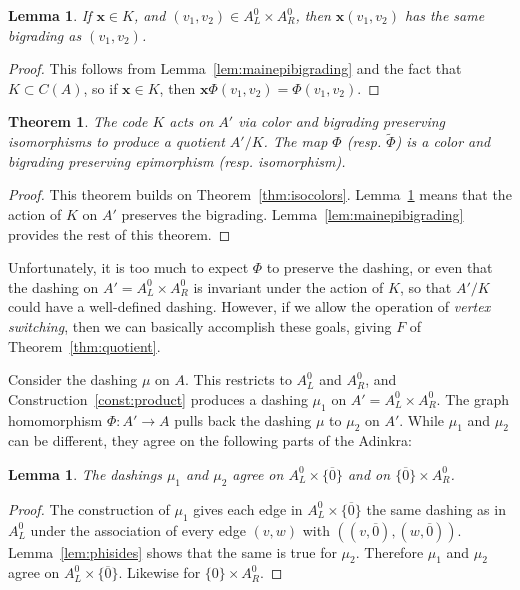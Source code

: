 \documentclass[12pt,twoside,singlespace]{article}
\numberwithin{equation}{section}
\newtheorem{thm}[equation]{Theorem}
\newtheorem{lem}[equation]{Lemma}
\theoremstyle{definition}
\renewcommand{\vec}[1]{\mathbf{#1}}
\begin{document}
\begin{lem}
\label{lem:kgrading}
If $\vec{x}\in K$, and $(v_1,v_2)\in A_L^0\times A_R^0$, then $\vec{x}(v_1,v_2)$ has the same bigrading as $(v_1,v_2)$.
\end{lem}
\begin{proof}
This follows from Lemma~\ref{lem:mainepibigrading} and the fact that $K\subset C(A)$, so if $\vec{x}\in K$, then $\vec{x}\Phi(v_1,v_2)=\Phi(v_1,v_2)$.
\end{proof}

\begin{thm}
\label{thm:isograding}
The code $K$ acts on $A'$ via color and bigrading preserving isomorphisms to produce a quotient $A'/K$.  The map $\Phi$ (resp. $\tilde{\Phi}$) is a color and bigrading preserving epimorphism (resp. isomorphism).
\end{thm}
\begin{proof}
This theorem builds on Theorem~\ref{thm:isocolors}.  Lemma~\ref{lem:kgrading} means that the action of $K$ on $A'$ preserves the bigrading.  Lemma~\ref{lem:mainepibigrading} provides the rest of this theorem.
\end{proof}


Unfortunately, it is too much to expect $\Phi$ to preserve the dashing, or even that the dashing on $A'=A_L^0\times A_R^0$ is invariant under the action of $K$, so that $A'/K$ could have a well-defined dashing.  However, if we allow the operation of \emph{vertex switching}, then we can basically accomplish these goals, giving $F$ of Theorem~\ref{thm:quotient}.

Consider the dashing $\mu$ on $A$.  This restricts to $A_L^0$ and $A_R^0$, and Construction~\ref{const:product} produces a dashing $\mu_1$ on $A'=A_L^0\times A_R^0$.   The graph homomorphism $\Phi:A'\to A$ pulls back the dashing $\mu$ to $\mu_2$ on $A'$. While $\mu_1$ and $\mu_2$ can be different, they agree on the following parts of the Adinkra:

\begin{lem}
\label{lem:agree-on-boundary}
The dashings $\mu_1$ and $\mu_2$ agree on $A_L^0\times \{\overline{0}\}$ and on $\{\overline{0}\}\times A_R^0$.
\end{lem}
\begin{proof}
The construction of $\mu_1$ gives each edge in $A_L^0\times\{\overline{0}\}$ the same dashing as in $A_L^0$ under the association of every edge $(v,w)$ with $((v,\overline{0}),(w,\overline{0}))$.  Lemma~\ref{lem:phisides} shows that the same is true for $\mu_2$.  Therefore $\mu_1$ and $\mu_2$ agree on $A_L^0\times\{\overline{0}\}$.  Likewise for $\{0\}\times A_R^0$.
\end{proof}
\end{document}
